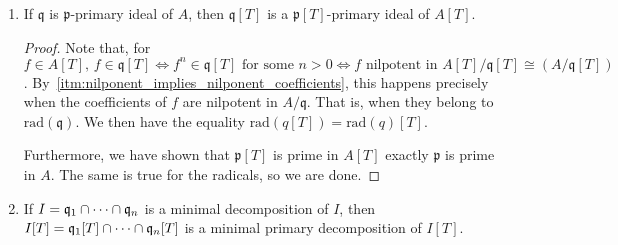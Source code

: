 \begin{problem}
\begin{enumerate}[label=(\theproblem.\arabic*),ref=\theproblem.\arabic*]
\begin{sol}
\begin{proof}
                Now, let $\mathfrak{p}$ be a minimal prime of $I$.
                $\mathfrak{p}[T]$ must contain a minimal prime of $I[T]$, say, $\mathfrak{p}'[T]$
                Then, we take the contraction $I \subseteq \mathfrak{p}' \subseteq \mathfrak{p}$
                and by definition of $\mathfrak{p}$ being a minimal of $I$,
                we conclude that $\mathfrak{p}' = \mathfrak{p}$ and $\mathfrak{p}'[T] = \mathfrak{p}[T]$.
                Thus, $\mathfrak{p}[T]$ is a minimal prime of $I[T]$.

            \end{proof}
        \end{sol}

        \item If $\mathfrak{q}$ is $\mathfrak{p}$-primary ideal of $A$, then $\mathfrak{q}[T]$ is a $\mathfrak{p}[T]$-primary ideal of $A[T]$.
        \begin{sol}

            \begin{proof}

            Note that, for $ f \in A[T], \, f \in \mathfrak{q}[T] \Leftrightarrow f^n \in \mathfrak{q}[T] \text{ for some } n > 0
            \Leftrightarrow f \text{ nilpotent in } A[T] / \mathfrak{q}[T] \cong (A/\mathfrak{q}[T])$.
            By~\ref{itm:nilponent_implies_nilponent_coefficients}, this happens precisely when
            the coefficients of $f$ are nilpotent in $A/\mathfrak{q}$.
            That is, when they belong to $\text{rad}(\mathfrak{q})$.
            We then have the equality $\text{rad}(q[T]) = \text{rad}(q)[T]$.

            Furthermore, we have shown that $\mathfrak{p}[T]$ is prime in $A[T]$ exactly $\mathfrak{p}$ is prime in $A$.
            The same is true for the radicals, so we are done.
            \end{proof}


        \end{sol}

        \item If $I = \mathfrak{q}_1 \cap \cdots \cap \mathfrak{q}_n$ is a minimal decomposition of $I$, then $I[T] = \mathfrak{q}_1[T] \cap \cdots \cap \mathfrak{q}_n[T]$ is a minimal primary decomposition of $I[T]$.
        \begin{sol}
        \end{sol}

    \end{enumerate}
\end{problem}